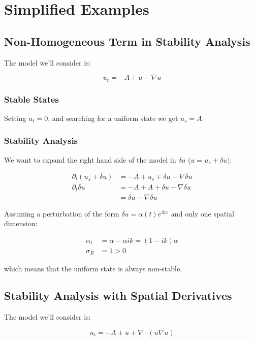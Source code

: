 \section{Simplified Examples}

\subsection{Non-Homogeneous Term in Stability Analysis}

The model we'll consider is:

\[
u_{t}=-A+u-\nabla u
\]


\subsubsection{Stable States}

Setting $u_{t}=0$, and searching for a uniform state we get $u_{s}=A$.

\subsubsection{Stability Analysis}

We want to expand the right hand side of the model in $\delta u$
($u=u_{s}+\delta u)$:

\begin{align*}
\partial_{t}\left(u_{s}+\delta u\right) & =-A+u_{s}+\delta u-\nabla\delta u\\
\partial_{t}\delta u & =-A+A+\delta u-\nabla\delta u\\
 & =\delta u-\nabla\delta u
\end{align*}

Assuming a perturbation of the form $\delta u=\alpha\left(t\right)e^{ikx}$
and only one spatial dimension:

\begin{align*}
\alpha_{t} & =\alpha-\alpha ik=\left(1-ik\right)\alpha\\
\sigma_{R} & =1>0
\end{align*}

which means that the uniform state is always non-stable.

\subsection{Stability Analysis with Spatial Derivatives}

The model we'll consider is:

\[
u_{t}=-A+u+\nabla\cdot\left(u\nabla u\right)
\]


